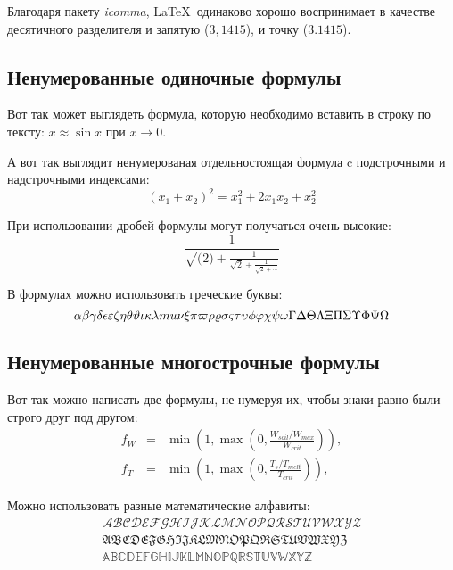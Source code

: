 Благодаря пакету \textit{icomma}, \LaTeX~одинаково хорошо воспринимает в качестве десятичного разделителя и запятую ($3,1415$), и точку ($3.1415$).

\subsection{Ненумерованные одиночные формулы} \label{subsect1_3_1}

Вот так может выглядеть формула, которую необходимо вставить в строку по тексту: $x \approx \sin x$ при $x \to 0$.

А вот так выглядит ненумерованая отдельностоящая формула c подстрочными и надстрочными индексами:
$$
(x_1+x_2)^2 = x_1^2 + 2 x_1 x_2 + x_2^2
$$

При использовании дробей формулы могут получаться очень высокие:
$$
  \frac{1}{\sqrt(2)+
  \displaystyle\frac{1}{\sqrt{2}+
  \displaystyle\frac{1}{\sqrt{2}+\cdots}}}
$$

В формулах можно использовать греческие буквы:
$$
\alpha\beta\gamma\delta\epsilon\varepsilon\zeta\eta\theta\vartheta\iota\kappa\lambda\\mu\nu\xi\pi\varpi\rho\varrho\sigma\varsigma\tau\upsilon\phi\varphi\chi\psi\omega\Gamma\Delta\Theta\Lambda\Xi\Pi\Sigma\Upsilon\Phi\Psi\Omega
$$


\subsection{Ненумерованные многострочные формулы} \label{subsect1_3_2}

Вот так можно написать две формулы, не нумеруя их, чтобы знаки равно были строго друг под другом:
\begin{eqnarray}
  f_W & = & \min \left( 1, \max \left( 0, \frac{W_{soil} / W_{max}}{W_{crit}} \right)  \right), \nonumber \\
  f_T & = & \min \left( 1, \max \left( 0, \frac{T_s / T_{melt}}{T_{crit}} \right)  \right), \nonumber
\end{eqnarray}

Можно использовать разные математические алфавиты:
\begin{eqnarray}
\mathcal{ABCDEFGHIJKLMNOPQRSTUVWXYZ} \nonumber \\
\mathfrak{ABCDEFGHIJKLMNOPQRSTUVWXYZ} \nonumber \\
\mathbb{ABCDEFGHIJKLMNOPQRSTUVWXYZ} \nonumber
\end{eqnarray}

